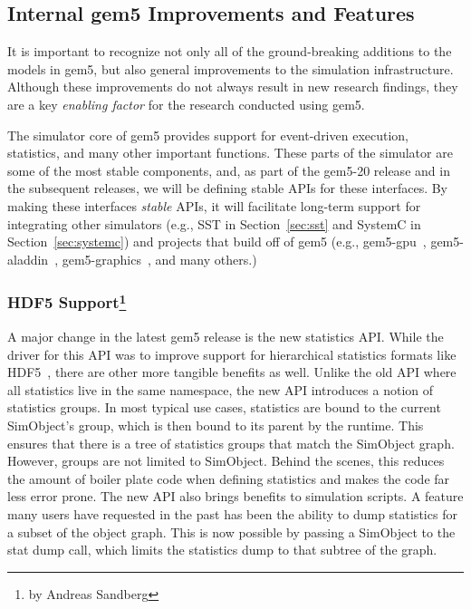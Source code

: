 \subsection{Internal gem5 Improvements and Features}
\label{sec:internal}

It is important to recognize not only all of the ground-breaking additions to the models in gem5, but also general improvements to the simulation infrastructure.
Although these improvements do not always result in new research findings, they are a key \emph{enabling factor} for the research conducted using gem5.

The simulator core of gem5 provides support for event-driven execution, statistics, and many other important functions.
These parts of the simulator are some of the most stable components, and, as part of the gem5-20 release and in the subsequent releases, we will be defining stable APIs for these interfaces.
By making these interfaces \emph{stable} APIs, it will facilitate long-term support for integrating other simulators (e.g., SST in Section~\ref{sec:sst} and SystemC in Section~\ref{sec:systemc}) and projects that build off of gem5 (e.g., gem5-gpu~\cite{PowerHOHW15}, gem5-aladdin~\cite{ShaoXSWB16}, gem5-graphics~\cite{GubranAamodt2019-emerald}, and many others.)

\subsubsection[HDF5 Support]{HDF5 Support\footnote{by Andreas Sandberg}}

A major change in the latest gem5 release is the new statistics API.
While the driver for this API was to improve support for hierarchical statistics formats like HDF5~\cite{}, there are other more tangible benefits as well.
Unlike the old API where all statistics live in the same namespace, the new API introduces a notion of statistics groups.
In most typical use cases, statistics are bound to the current SimObject's group, which is then bound to its parent by the runtime.
This ensures that there is a tree of statistics groups that match the SimObject graph.
However, groups are not limited to SimObject.
Behind the scenes, this reduces the amount of boiler plate code when defining statistics and makes the code far less error prone.
The new API also brings benefits to simulation scripts.
A feature many users have requested in the past has been the ability to dump statistics for a subset of the object graph.
This is now possible by passing a SimObject to the stat dump call, which limits the statistics dump to that subtree of the graph.

